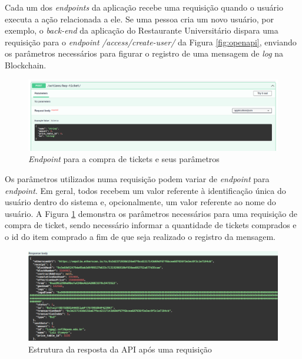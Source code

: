 Cada um dos \emph{endpoints} da aplicação recebe uma requisição quando o usuário executa a ação relacionada a ele. Se uma pessoa cria um novo usuário, por exemplo, o \emph{back-end} da aplicação do Restaurante Universitário dispara uma requisição para o \emph{endpoint} \emph{/access/create-user/} da Figura \ref{fig:openapi}, enviando os parâmetros necessários para figurar o registro de uma mensagem de \emph{log} na Blockchain.

\begin{figure}
    \centering
    \includegraphics[width=1\textwidth]{img/Cap4/endpoint.png}
    \caption{\emph{Endpoint} para a compra de tickets e seus parâmetros}
    \label{fig:endpoint}
\end{figure}

Os parâmetros utilizados numa requisição podem variar de \emph{endpoint} para \emph{endpoint}. Em geral, todos recebem um valor referente à identificação única do usuário dentro do sistema e, opcionalmente, um valor referente ao nome do usuário. A Figura \ref{fig:endpoint} demonstra os parâmetros necessários para uma requisição de compra de ticket, sendo necessário informar a quantidade de tickets comprados e o id do item comprado a fim de que seja realizado o registro da mensagem.

\begin{figure}
    \centering
    \includegraphics[width=1\textwidth]{img/Cap4/resposta.png}
    \caption{Estrutura da resposta da API após uma requisição}
    \label{fig:resposta}
\end{figure}

